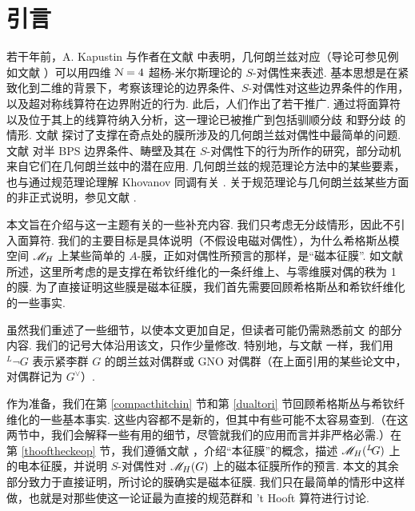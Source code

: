 \section{引言}\label{intro}

若干年前，A. Kapustin 与作者在文献 \cite{KW} 中表明，几何朗兰兹对应（导论可参见例如文献 \cite{frenkel}）可以用四维 ${\cal N}=4$ 超杨-米尔斯理论的 $S$-对偶性来表述. 基本思想是在紧致化到二维的背景下，考察该理论的边界条件、$S$-对偶性对这些边界条件的作用，以及超对称线算符在边界附近的行为. 此后，人们作出了若干推广. 通过将面算符以及位于其上的线算符纳入分析，这一理论已被推广到包括驯顺分歧 \cite{GW} 和野分歧 \cite{Wild} 的情形. 文献 \cite{FW} 探讨了支撑在奇点处的膜所涉及的几何朗兰兹对偶性中最简单的问题. 文献 \cite{GaiW,GaiW2} 对半 BPS 边界条件、畴壁及其在 $S$-对偶性下的行为所作的研究，部分动机来自它们在几何朗兰兹中的潜在应用. 几何朗兰兹的规范理论方法中的某些要素，也与通过规范理论理解 Khovanov 同调有关 \cite{WittenKhov}. 关于规范理论与几何朗兰兹某些方面的非正式说明，参见文献 \cite{EW1,EW2,EW3}.

本文旨在介绍与这一主题有关的一些补充内容. 我们只考虑无分歧情形，因此不引入面算符. 我们的主要目标是具体说明（不假设电磁对偶性），为什么希格斯丛模空间 ${{\mathscr{M}}_H}$ 上某些简单的 $A$-膜，正如对偶性所预言的那样，是“磁本征膜”. 如文献 \cite{KW} 所述，这里所考虑的是支撑在希钦纤维化的一条纤维上、与零维膜对偶的秩为 1 的膜. 为了直接证明这些膜是磁本征膜，我们首先需要回顾希格斯丛和希钦纤维化的一些事实.

虽然我们重述了一些细节，以使本文更加自足，但读者可能仍需熟悉前文 \cite{KW} 的部分内容. 我们的记号大体沿用该文，只作少量修改. 特别地，与文献 \cite{KW} 一样，我们用 $^L\neg G$ 表示紧李群 $G$ 的朗兰兹对偶群或 GNO 对偶群（在上面引用的某些论文中，对偶群记为 $G^\vee$）.

作为准备，我们在第 \ref{compacthitchin} 节和第 \ref{dualtori} 节回顾希格斯丛与希钦纤维化的一些基本事实. 这些内容都不是新的，但其中有些可能不太容易查到.（在这两节中，我们会解释一些有用的细节，尽管就我们的应用而言并非严格必需.）在第 \ref{thooftheckeop} 节，我们遵循文献 \cite{KW}，介绍“本征膜”的概念，描述 ${{\mathscr{M}}_H}(^L\negthinspace G)$ 上的电本征膜，并说明 $S$-对偶性对 ${{\mathscr{M}}_H}(G)$ 上的磁本征膜所作的预言. 本文的其余部分致力于直接证明，所讨论的膜确实是磁本征膜. 我们只在最简单的情形中这样做，也就是对那些使这一论证最为直接的规范群和 't Hooft 算符进行讨论.

